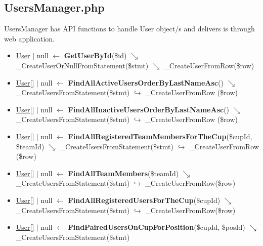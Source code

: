 \subsection{UsersManager.php}
UsersManager has API functions to handle User object/s and delivers is through web application.
\begin{itemize}
  \setlength\itemsep{0em}
  \item \underline{User} $\vert$ null $\leftarrow$ \textbf{GetUserById}(\$id)
  \newline    $\searrow$ \_CreateUserOrNullFromStatement(\$stmt)
  \newline    $\searrow$ \_CreateUserFromRow(\$row)
  \item \underline{User[]} $\vert$ null $\leftarrow$ \textbf{FindAllActiveUsersOrderByLastNameAsc}()
  \newline    $\searrow$ \_CreateUsersFromStatement(\$stmt)
  \newline    $\hookrightarrow$ \_CreateUserFromRow (\$row)
  \item \underline{User[]} $\vert$ null $\leftarrow$ \textbf{FindAllInactiveUsersOrderByLastNameAsc}()
  \newline    $\searrow$ \_CreateUsersFromStatement(\$stmt)
  \newline    $\hookrightarrow$ \_CreateUserFromRow (\$row)
  \item \underline{User[]} $\vert$ null $\leftarrow$ \textbf{FindAllRegisteredTeamMembersForTheCup}(\$cupId, \$teamId)
  \newline    $\searrow$ \_CreateUsersFromStatement(\$stmt)
  \newline    $\hookrightarrow$ \_CreateUserFromRow (\$row)
  \item \underline{User[]} $\vert$ null $\leftarrow$ \textbf{FindAllTeamMembers}(\$teamId)
  \newline    $\searrow$ \_CreateUsersFromStatement(\$stmt)
  \newline    $\hookrightarrow$ \_CreateUserFromRow(\$row)
  \item \underline{User[]} $\vert$ null $\leftarrow$ \textbf{FindAllRegisteredUsersForTheCup}(\$cupId)
  \newline    $\searrow$ \_CreateUsersFromStatement(\$stmt)
  \newline    $\hookrightarrow$ \_CreateUserFromRow(\$row)
  \item \underline{User[]} $\vert$ null $\leftarrow$ \textbf{FindPairedUsersOnCupForPosition}(\$cupId, \$posId)
  \newline    $\searrow$ \_CreateUsersFromStatement(\$stmt)

\end{itemize}
